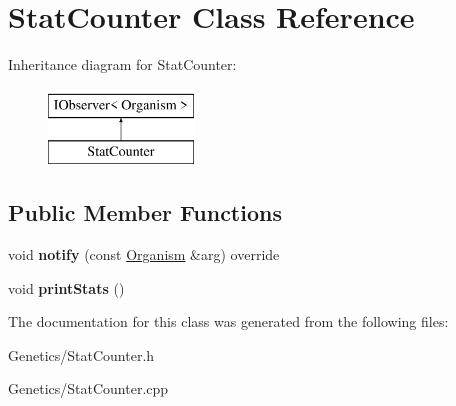 \hypertarget{class_stat_counter}{}\section{Stat\+Counter Class Reference}
\label{class_stat_counter}
Inheritance diagram for Stat\+Counter\+:\begin{figure}[H]
\begin{center}
\leavevmode
\includegraphics[height=2.000000cm]{class_stat_counter}
\end{center}
\end{figure}
\subsection*{Public Member Functions}
\begin{DoxyCompactItemize}
\item 
void {\bfseries notify} (const \hyperlink{class_organism}{Organism} \&arg) override\hypertarget{class_stat_counter_a81f82e98e35f1571565f2e1bc54de471}{}\label{class_stat_counter_a81f82e98e35f1571565f2e1bc54de471}

\item 
void {\bfseries print\+Stats} ()\hypertarget{class_stat_counter_ada1a2c28945b0bedd7840068e6cf770f}{}\label{class_stat_counter_ada1a2c28945b0bedd7840068e6cf770f}

\end{DoxyCompactItemize}


The documentation for this class was generated from the following files\+:\begin{DoxyCompactItemize}
\item 
Genetics/Stat\+Counter.\+h\item 
Genetics/Stat\+Counter.\+cpp\end{DoxyCompactItemize}
